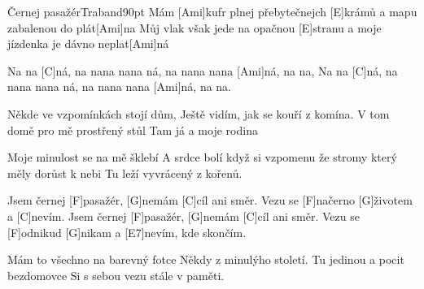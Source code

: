 \begin{song}{Černej pasažér}{Traband}{90pt}
%
Mám [Ami]kufr plnej přebytečnejch [E]krámů
a mapu zabalenou do plát[Ami]na
Můj vlak však jede na opačnou [E]stranu
a moje jízdenka je dávno neplat[Ami]ná

\verse{*}%
Na na [C]ná, na nana nana ná, na nana nana [Ami]ná, na na,
Na na [C]ná, na nana nana ná, na nana nana [Ami]ná, na na.

%
Někde ve vzpomínkách stojí dům,
Ještě vidím, jak se kouří z komína.
V tom domě pro mě prostřený stůl
Tam já a moje rodina

%
Moje minulost se na mě šklebí
A srdce bolí když si vzpomenu
že stromy který měly dorůst k nebi
Tu leží vyvrácený z kořenů.

\chorus%
Jsem černej [F]pasažér, [G]nemám [C]cíl ani směr.
Vezu se [F]načerno [G]{}životem a [C]nevím.
Jsem černej [F]pasažér, [G]nemám [C]cíl ani směr.
Vezu se [F]odnikud [G]nikam a [E7]nevím, kde skončím.

%
Mám to všechno na barevný fotce
Někdy z minulýho století.
Tu jedinou a pocit bezdomovce
Si s sebou vezu stále v paměti.
\repchor

\end{song}
